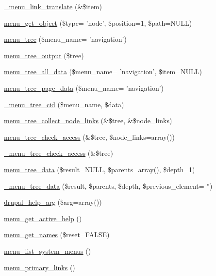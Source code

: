 \begin{CompactItemize}
\item 
\hyperlink{group__menu_g360d727a77cd570860dc7b8382cdba05}{\_\-menu\_\-link\_\-translate} (\&\$item)
\item 
\hyperlink{group__menu_g8b1c8825ae7b6ae31b50cadaa1f7c920}{menu\_\-get\_\-object} (\$type= 'node', \$position=1, \$path=NULL)
\item 
\hyperlink{group__menu_ga43c3a496679a1cc16d02d76d0422752}{menu\_\-tree} (\$menu\_\-name= 'navigation')
\item 
\hyperlink{group__menu_g2ef0691992a9df71eb3455ba774053e7}{menu\_\-tree\_\-output} (\$tree)
\item 
\hyperlink{group__menu_ga4b0957cc1027dae4f4093b1b884227d}{menu\_\-tree\_\-all\_\-data} (\$menu\_\-name= 'navigation', \$item=NULL)
\item 
\hyperlink{group__menu_g84e2ecf44d5b72159370c74c910e93e3}{menu\_\-tree\_\-page\_\-data} (\$menu\_\-name= 'navigation')
\item 
\hyperlink{group__menu_g165ee791b785630b578b0f737812b8b7}{\_\-menu\_\-tree\_\-cid} (\$menu\_\-name, \$data)
\item 
\hyperlink{group__menu_g0c9a63fbbdf8496828f1f80d37459475}{menu\_\-tree\_\-collect\_\-node\_\-links} (\&\$tree, \&\$node\_\-links)
\item 
\hyperlink{group__menu_g6374db210d96026fb70431def083a7a5}{menu\_\-tree\_\-check\_\-access} (\&\$tree, \$node\_\-links=array())
\item 
\hyperlink{group__menu_gd59ba7ae64f452408201f82f8cb7dc25}{\_\-menu\_\-tree\_\-check\_\-access} (\&\$tree)
\item 
\hyperlink{group__menu_gbf77de9e90a7f2c4f889a74cde1ee3e4}{menu\_\-tree\_\-data} (\$result=NULL, \$parents=array(), \$depth=1)
\item 
\hyperlink{group__menu_g70d13ba2c42c6b0da4b0ef68bcc7ed0d}{\_\-menu\_\-tree\_\-data} (\$result, \$parents, \$depth, \$previous\_\-element= '')
\item 
\hyperlink{group__menu_g00dce79e81030a75c94c7a279794b253}{drupal\_\-help\_\-arg} (\$arg=array())
\item 
\hyperlink{group__menu_g21c6572391132f4e1f5b3fd108220bf4}{menu\_\-get\_\-active\_\-help} ()
\item 
\hyperlink{group__menu_gb537c9640c2d63c4c5208412987d7045}{menu\_\-get\_\-names} (\$reset=FALSE)
\item 
\hyperlink{group__menu_g28e765ff428a3f18978af564ee0147d6}{menu\_\-list\_\-system\_\-menus} ()
\item 
\hyperlink{group__menu_g472245ad15500b2f7b253f679afd90c7}{menu\_\-primary\_\-links} ()

\end{CompactItemize}
